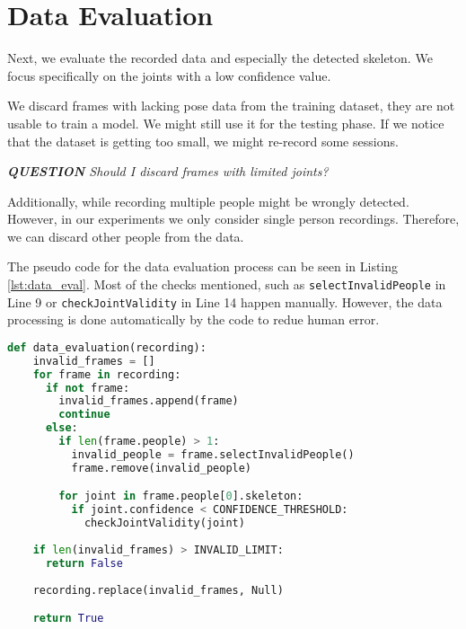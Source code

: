 \section{Data Evaluation}
\label{sec:data_evaluation}

Next, we evaluate the recorded data and especially the detected skeleton. We focus specifically on the joints with a low confidence value. 

We discard frames with lacking pose data from the training dataset, they are not usable to train a model. We might still use it for the testing phase. If we notice that the dataset is getting too small, we might re-record some sessions.

\textit{\textbf{QUESTION} Should I discard frames with limited joints?}

Additionally, while recording multiple people might be wrongly detected. However, in our experiments we only consider single person recordings. Therefore, we can discard other people from the data.

The pseudo code for the data evaluation process can be seen in Listing \ref{lst:data_eval}. Most of the checks mentioned, such as \texttt{selectInvalidPeople} in Line 9 or \texttt{checkJointValidity} in Line 14 happen manually. However, the data processing is done automatically by the code to redue human error.

\begin{lstlisting}[language=python,
                    firstnumber=1,
                    caption={[Pseudo code for data evaluation]{Pseudo code for data evaluation}},
                    label={lst:data_eval}]
  def data_evaluation(recording):
    invalid_frames = []
    for frame in recording:
      if not frame:
        invalid_frames.append(frame)
        continue
      else:
        if len(frame.people) > 1:
          invalid_people = frame.selectInvalidPeople()
          frame.remove(invalid_people)

        for joint in frame.people[0].skeleton:
          if joint.confidence < CONFIDENCE_THRESHOLD:
            checkJointValidity(joint)
    
    if len(invalid_frames) > INVALID_LIMIT:
      return False
    
    recording.replace(invalid_frames, Null)

    return True
\end{lstlisting}
